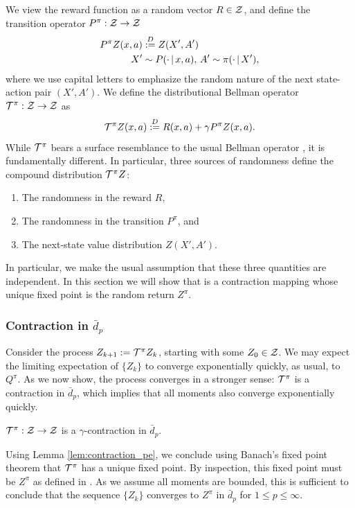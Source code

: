 \documentclass{article}
\def \Ddef {\overset{D}{:=}}
\def \cTpi {\cT^\pi}
\def \dip {\bar d_p}
\begin{document}
We view the reward function as a random vector $R \in \mathcal{Z}$, and define the transition operator $P^\pi : \mathcal{Z} \to \mathcal{Z}$
\begin{align}
P^\pi Z(x, a) &\Ddef Z(X', A') \label{eqn:policy_operator} \\
X' &\sim P(\cdot \cbar x, a), \, A' \sim \pi(\cdot \cbar X'), \nonumber
\end{align}
where we use capital letters to emphasize the random nature of the next state-action pair $(X', A')$.
We define the distributional Bellman operator $\cTpi : \cZ \to \cZ$ as
\begin{equation}
\cTpi Z(x,a) \Ddef R(x,a) + \gamma P^\pi Z(x,a). \label{eqn:distributional_bellman_operator_pe}
\end{equation}
While $\cTpi$ bears a surface resemblance to the usual Bellman operator , it  is fundamentally different. In particular, three sources of randomness define the compound distribution $\cTpi Z$:
\begin{enumerate}[noitemsep,label=\alph*)]
	\item The randomness in the reward $R$,
	\item The randomness in the transition $P^\pi$, and
	\item The next-state value distribution $Z(X', A')$.
\end{enumerate}
In particular, we make the usual assumption that these three quantities are independent.
In this section we will show that  is a contraction mapping whose  unique fixed point is the random return $Z^\pi$.

\subsubsection{Contraction in $\dip$}
Consider the process $Z_{k+1} := \cTpi Z_k$, starting with some $Z_0 \in \mathcal{Z}$. We may expect the limiting expectation of $\{ Z_k \}$ to converge exponentially quickly, as usual, to $Q^\pi$. As we now show, the process converges in a stronger sense: $\cTpi$ is a contraction in $\dip$, which implies that all moments also converge exponentially quickly.

\begin{lem}\label{lem:contraction_pe}
%
$\cTpi : \cZ \to \cZ$ is a $\gamma$-contraction in $\dip$.
\end{lem}
Using Lemma \ref{lem:contraction_pe}, we conclude using Banach's fixed point theorem that $\cTpi$ has a unique fixed point. By inspection, this fixed point must be $Z^\pi$ as defined in . As we assume all moments are bounded, this is sufficient to conclude that the sequence $\{ Z_k \}$ converges to $Z^\pi$ in $\dip$ for $1 \le p \le \infty$.
\end{document}
